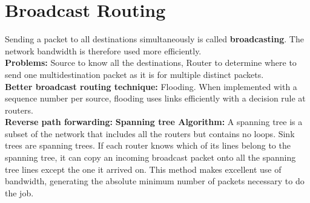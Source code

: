 \documentclass[a4paper,oneside]{book}
\begin{document}
\section{Broadcast Routing}
Sending a packet to all destinations simultaneously is called \textbf{broadcasting}.  The network bandwidth is therefore used more efficiently.\\
\textbf{Problems:} Source to know all the destinations, Router to determine where to send one multidestination packet as it is for multiple distinct packets.\\
\textbf{Better broadcast routing technique:} Flooding. When implemented with a sequence number per source, flooding uses links efficiently
with a decision rule at routers.\\
\textbf{Reverse path forwarding:} 
\textbf{Spanning tree Algorithm:}  A spanning tree is a subset of the network that includes all the routers but contains no loops. Sink trees are spanning trees. If each router knows which of its lines belong to the spanning tree, it can copy an incoming broadcast packet onto all the spanning tree lines except the one it arrived on. This method makes excellent use of bandwidth, generating the absolute minimum number of packets necessary to do the job. 
\end{document}
